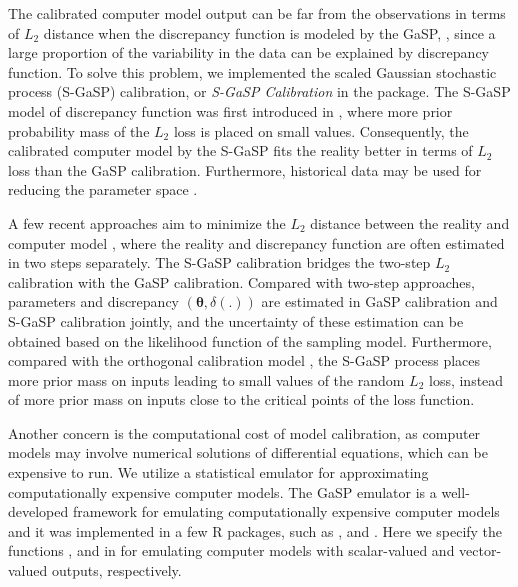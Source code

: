The calibrated computer model output can be far from the observations in terms of $L_2$ distance when the discrepancy function is modeled by the GaSP,  \citep{arendt2012quantification}, since a large proportion of the variability in the data can be explained by discrepancy function. 
To solve this problem, we implemented the scaled Gaussian stochastic process (S-GaSP) calibration, or  \textit{S-GaSP Calibration} in the  package. The S-GaSP model of discrepancy function  was first introduced in \cite{gu2018sgasp}, where more prior probability mass of the $L_2$ loss is placed on small values. Consequently, the calibrated computer model by the S-GaSP  fits the reality better in terms of $L_2$ loss than the GaSP calibration. 
Furthermore, historical data may be  used for reducing the parameter space \citep{williamson2013history}. 

 A few recent approaches aim to minimize the  $L_2$ distance between the reality and computer model \citep{tuo2015efficient,wong2017frequentist}, where the reality and discrepancy function are often estimated in two steps separately. The S-GaSP calibration bridges the two-step $L_2$ calibration with the GaSP calibration. Compared with  two-step approaches, parameters  and discrepancy $(\bm \theta, \delta(.))$ are estimated in {GaSP calibration} and {S-GaSP calibration} jointly, and the uncertainty of these estimation can be obtained based on the likelihood function of the sampling model. Furthermore, compared with the orthogonal calibration model \citep{plumlee2017bayesian}, the S-GaSP process places more prior mass on inputs leading to small values of the random $L_2$ loss, instead of more prior mass on inputs close to the critical points of the loss function. 
 
{Another concern is the computational cost of model calibration, as computer models may involve  numerical solutions of differential equations, which can be expensive to run. We utilize} a statistical emulator    for approximating computationally expensive computer models. The GaSP emulator  is a well-developed framework for emulating computationally expensive computer models and it was implemented in a few {R} packages, such as  \citep{roustant2012dicekriging},  \citep{macdonald2015gpfit} and   \citep{gu2018robustgasp}. Here we specify the functions ,  and  in  for emulating  computer models with scalar-valued and vector-valued outputs, respectively. 






